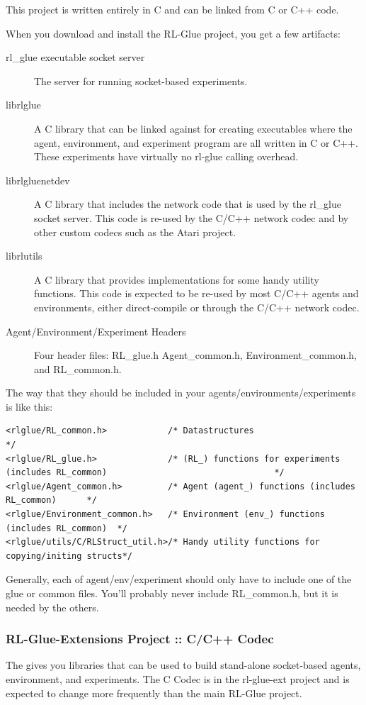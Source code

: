\documentclass[11pt]{article}
\begin{document}
This project is written entirely in C and can be linked from C or C++ code.

When you download and install the RL-Glue project, you get a few artifacts:
\begin{description}
	\item [rl\_glue executable socket server] The server for running socket-based experiments.
	\item [librlglue] A C library that can be linked against for creating executables where the agent, environment, and experiment program are all written in C or C++. These experiments have virtually no rl-glue calling overhead.
	\item [librlgluenetdev] A C library that includes the network code that is used by the rl\_glue socket server.  This code is re-used by the C/C++ network codec and by other custom codecs such as the Atari project.
	\item [librlutils] A C library that provides implementations for some handy utility functions.  This code is expected to be re-used by most C/C++ agents and environments, either direct-compile or through the C/C++ network codec.
	\item [Agent/Environment/Experiment Headers]  Four header files: RL\_glue.h Agent\_common.h, Environment\_common.h, and RL\_common.h. 
\end{description}
 
The way that they should be included in your agents/environments/experiments is like this:
\begin{verbatim}
<rlglue/RL_common.h>            /* Datastructures                                     */
<rlglue/RL_glue.h>              /* (RL_) functions for experiments (includes RL_common)                                 */
<rlglue/Agent_common.h>         /* Agent (agent_) functions (includes RL_common)      */
<rlglue/Environment_common.h>   /* Environment (env_) functions (includes RL_common)  */
<rlglue/utils/C/RLStruct_util.h>/* Handy utility functions for copying/initing structs*/
\end{verbatim} 

Generally, each of agent/env/experiment should only have to include one of the glue or common files.  You'll probably never include RL\_common.h, but it is needed by the others.

\subsubsection{RL-Glue-Extensions Project :: C/C++ Codec}
The  gives you libraries that can be used to build stand-alone socket-based agents, environment, and experiments.  The C Codec is in the rl-glue-ext project and is expected to change more frequently than the main RL-Glue project.
\end{document}
